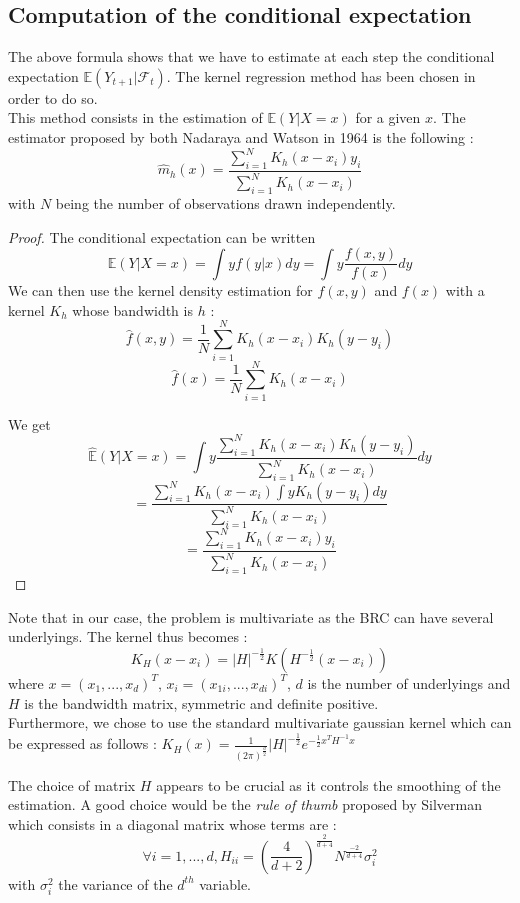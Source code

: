 \documentclass[a4paper,11pt,english]{book}
\begin{document}
\subsection{Computation of the conditional expectation}
\label{subsec:conditional-expectation}
The above formula shows that we have to estimate at each step the conditional expectation $\mathbb{E}(Y_{t+1}|\mathcal{F}_{t})$. The kernel regression method has been chosen in order to do so.\\

This method consists in the estimation of $\mathbb{E}(Y|X=x)$ for a given $x$. The estimator proposed by both Nadaraya\cite{nadaraya1964estimating} and Watson\cite{watson1964smooth} in 1964 is the following : $$\hat{m}_{h}(x)=\frac{\sum_{i=1}^{N}K_{h}(x-x_{i})y_{i}}{\sum_{i=1}^{N}K_{h}(x-x_{i})}$$
with $N$ being the number of observations drawn independently.\\

\begin{proof}
The conditional expectation can be written $$\mathbb{E}(Y|X=x)=\int yf(y|x)dy = \int y\frac{f(x,y)}{f(x)}dy$$
We can then use the kernel density estimation for $f(x,y)$ and $f(x)$ with a kernel $K_{h}$ whose bandwidth is $h$ : $$\hat{f}(x,y) = \frac{1}{N}\sum_{i=1}^{N}K_{h}(x-x_{i})K_{h}(y-y_{i})$$
$$\hat{f}(x) = \frac{1}{N}\sum_{i=1}^{N}K_{h}(x-x_{i})$$

We get $$\hat{\mathbb{E}}(Y|X=x) = \int y\frac{\sum_{i=1}^{N}K_{h}(x-x_{i})K_{h}(y-y_{i})}{\sum_{i=1}^{N}K_{h}(x-x_{i})}dy$$
$$=\frac{\sum_{i=1}^{N}K_{h}(x-x_{i})\int y K_{h}(y-y_{i})dy }{\sum_{i=1}^{N}K_{h}(x-x_{i})}$$
$$=\frac{\sum_{i=1}^{N}K_{h}(x-x_{i})y_{i}}{\sum_{i=1}^{N}K_{h}(x-x_{i})}$$
\end{proof}

Note that in our case, the problem is multivariate as the BRC can have several underlyings. The kernel thus becomes : $$K_{H}(x-x_{i}) = |H|^{-\frac{1}{2}}K(H^{-\frac{1}{2}}(x-x_{i}))$$
where $x=(x_{1},...,x_{d})^{T}$, $x_{i}=(x_{1i},...,x_{di})^{T}$, $d$ is the number of underlyings and $H$ is the bandwidth matrix, symmetric and definite positive.\\

Furthermore, we chose to use the standard multivariate gaussian kernel which can be expressed as follows :
$K_{H}(x)=\frac{1}{(2\pi)^{\frac{d}{2}}}|H|^{-\frac{1}{2}}e^{-\frac{1}{2}x^{T}H^{-1}x}$

The choice of matrix $H$ appears to be crucial as it controls the smoothing of the estimation. A good choice would be the \textit{rule of thumb} proposed by Silverman\cite{silverman1986density} which consists in a diagonal matrix whose terms are : $$\forall i=1,...,d, H_{ii} = (\frac{4}{d+2})^{\frac{2}{d+4}}N^{\frac{-2}{d+4}}\sigma_{i}^{2}$$
with $\sigma_{i}^{2}$ the variance of the $d^{th}$ variable.\\
\end{document}
